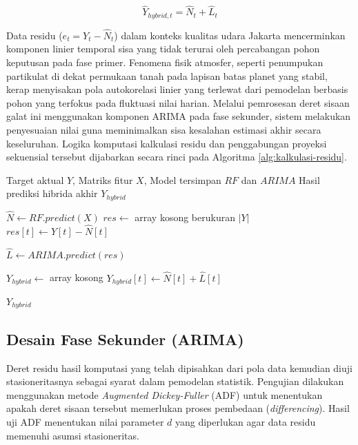 \begin{equation}
\hat{Y}_{hybrid, t} = \hat{N}_t + \hat{L}_t
\label{eq:hybrid_sum}
\end{equation}

Data residu ($e_t = Y_t - \hat{N}_t$) dalam konteks kualitas udara Jakarta mencerminkan komponen linier temporal sisa yang tidak terurai oleh percabangan pohon keputusan pada fase primer. Fenomena fisik atmosfer, seperti penumpukan partikulat di dekat permukaan tanah pada lapisan batas planet yang stabil, kerap menyisakan pola autokorelasi linier yang terlewat dari pemodelan berbasis pohon yang terfokus pada fluktuasi nilai harian. Melalui pemrosesan deret sisaan galat ini menggunakan komponen ARIMA pada fase sekunder, sistem melakukan penyesuaian nilai guna meminimalkan sisa kesalahan estimasi akhir secara keseluruhan. Logika komputasi kalkulasi residu dan penggabungan proyeksi sekuensial tersebut dijabarkan secara rinci pada Algoritma \ref{alg:kalkulasi-residu}.

\begin{algorithm}[htbp]
\caption{Kalkulasi Residu Hibrida Sekuensial}
\label{alg:kalkulasi-residu}
\begin{algorithmic}[1]
\Require Target aktual $Y$, Matriks fitur $X$, Model tersimpan $RF$ dan $ARIMA$
\Ensure Hasil prediksi hibrida akhir $Y_{hybrid}$

\State $\hat{N} \gets RF.predict(X)$ 
\State $res \gets$ array kosong berukuran $|Y|$
    \State $res[t] \gets Y[t] - \hat{N}[t]$ 
\EndFor

\State $\hat{L} \gets ARIMA.predict(res)$ 

\State $Y_{hybrid} \gets$ array kosong
    \State $Y_{hybrid}[t] \gets \hat{N}[t] + \hat{L}[t]$
\EndFor

\State \Return $Y_{hybrid}$
\end{algorithmic}
\end{algorithm}

\subsection{Desain Fase Sekunder (ARIMA)}

Deret residu hasil komputasi yang telah dipisahkan dari pola data kemudian diuji stasioneritasnya sebagai syarat dalam pemodelan statistik. Pengujian dilakukan menggunakan metode \textit{Augmented Dickey-Fuller} (ADF) untuk menentukan apakah deret sisaan tersebut memerlukan proses pembedaan (\textit{differencing}). Hasil uji ADF menentukan nilai parameter $d$ yang diperlukan agar data residu memenuhi asumsi stasioneritas.

